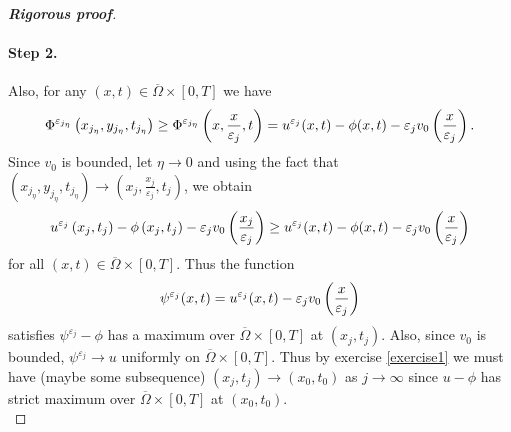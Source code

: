 \documentclass[12pt, oneside]{amsart}  	%
\begin{document}
\begin{proof}[\textbf{Rigorous proof}]
\paragraph{\textbf{Step 2.}} Also, for any $(x,t)\in \overline{\Omega}\times [0,T]$ we have
\begin{equation*}
\Phi^{\varepsilon_{j_\eta}}\left(x_{j_\eta}, {y_{j_\eta}}, t_{j_\eta}\right) \geq  \Phi^{\varepsilon_{j_\eta}}\left(x, \frac{x}{\varepsilon_j}, t\right) = u^{\varepsilon_j}(x,t) -  \phi(x,t) -\varepsilon_j v_0\left(\frac{x}{\varepsilon_j}\right).
\end{equation*}
Since $v_0$ is bounded, let $\eta\longrightarrow 0$ and using the fact that $\left(x_{j_\eta}, {y_{j_\eta}}, t_{j_\eta}\right) \longrightarrow \left(x_j, \frac{x_j}{\varepsilon_j}, t_j\right)$, we obtain
\begin{equation*}
u^{\varepsilon_j}\left(x_j,t_j\right) -  \phi\left(x_j,t_j\right) -\varepsilon_j v_0\left(\frac{x_j}{\varepsilon_j}\right) \geq u^{\varepsilon_j}(x,t) -  \phi(x,t) -\varepsilon_j v_0\left(\frac{x}{\varepsilon_j}\right)
\end{equation*}
for all $(x,t)\in \overline{\Omega}\times [0,T]$. Thus the function
\begin{equation*}
\psi^{\varepsilon_j}(x,t)= u^{\varepsilon_j}(x,t) -\varepsilon_j v_0\left(\frac{x}{\varepsilon_j}\right)
\end{equation*}
satisfies $\psi^{\varepsilon_j} - \phi$ has a maximum over $\overline{\Omega}\times [0,T]$ at $\left(x_j,t_j\right)$. Also, since $v_0$ is bounded, $\psi^{\varepsilon_j}\longrightarrow u$ uniformly on $\overline{\Omega}\times [0,T]$. Thus by exercise \ref{exercise1} we must have (maybe some subsequence) $\left(x_j,t_j\right) \longrightarrow \left(x_0,t_0\right)$
as $j \longrightarrow \infty$ since $u-\phi$ has strict maximum over $\overline{\Omega}\times [0,T]$ at $\left(x_0,t_0\right)$.\\










\end{proof}
\end{document}
